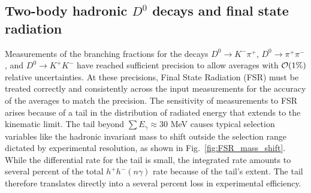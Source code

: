 \subsection{Two-body hadronic $D^0$ decays and final state radiation}

Measurements of the branching fractions for the decays $D^0\to K^-\pi^+$,
$D^0\to \pi^+\pi^-$, and $D^0\to K^+ K^-$ have reached sufficient precision to
allow averages with ${\cal O}(1\%)$ relative uncertainties. 
At these precisions, Final 
State Radiation (FSR) must be treated correctly and consistently across 
the input measurements for the accuracy of the averages to match the 
precision.  The sensitivity of measurements to FSR arises because of 
a tail in the distribution of radiated energy that extends to the 
kinematic limit.  The tail beyond $\sum{E_\gamma} \approx 30$ MeV causes 
typical selection variables like the hadronic invariant mass to 
shift outside the selection range dictated by experimental 
resolution, as shown in Fig.~\ref{fig:FSR_mass_shift}.  While the 
differential rate for the tail is small, the integrated rate 
amounts to several percent of the total $h^+ h^-(n\gamma)$ 
rate because of the tail's extent.  The tail therefore 
translates directly into a several percent loss in 
experimental efficiency.


